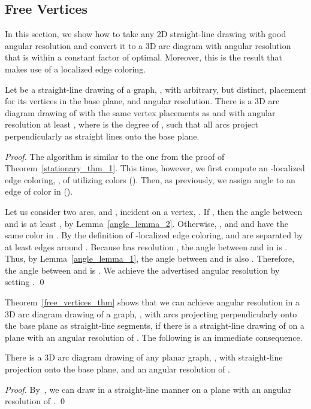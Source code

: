 \subsection{Free Vertices}
In this section, we show how to take any 2D straight-line 
drawing with good angular resolution and convert it to a 3D arc diagram
with angular resolution that is within a constant factor of optimal.
Moreover, this is the result that makes use of a localized edge coloring.

\begin{theorem}
Let  be a straight-line drawing of a graph, , with arbitrary,
but distinct, placement for its vertices in the base plane, and
 angular resolution. There is
a 3D arc diagram drawing of  with the same vertex placements as 
and with angular resolution at least , where 
is the degree of , such that all arcs project perpendicularly
as straight lines onto the base plane.
\label{free_vertices_thm}
\end{theorem}
\begin{proof}
The algorithm is similar to the one from the proof of
Theorem~\ref{stationary_thm_1}. This time, however, we first compute an
-localized edge coloring, , of  utilizing  colors
(). Then, as previously, we assign angle
 to an edge  of color  in
 ().

Let us consider two arcs,  and , incident on a vertex, .
If , then the angle between  and 
is at least , by Lemma~\ref{angle_lemma_2}.
Otherwise, , and  and  have the same
color in . By the definition of -localized edge
coloring,  and  are separated by at least  edges around
. Because  has resolution , the angle
between  and  in  is . Thus, by
Lemma~\ref{angle_lemma_1}, the angle between  and 
is also .
Therefore, the angle between  and  is
. We achieve the
advertised angular resolution by setting .
\qed
\end{proof}

Theorem~\ref{free_vertices_thm} shows that we can achieve
 angular resolution in a 3D arc diagram drawing
of a graph, , with arcs projecting perpendicularly onto the base plane
as straight-line segments, if there is a straight-line drawing of 
on a plane with an angular resolution of . The following is
an immediate consequence.

\begin{corollary}
There is a 3D arc diagram drawing of any planar graph, ,
with straight-line projection onto the base plane,
and an angular resolution of .
\end{corollary}
\begin{proof}
By~\cite{DBLP:conf/focs/FormannHHKLSWW90}, we can draw 
in a straight-line manner on a plane with an angular
resolution of .
\qed
\end{proof}

